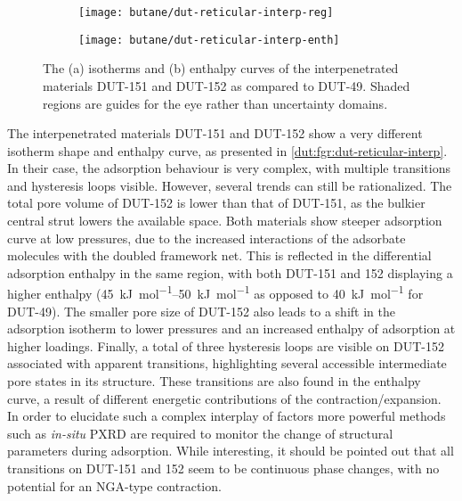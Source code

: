 \begin{figure}[htb]
    \centering
    \begin{subfigure}{0.5\linewidth}
        \texttt{[image: butane/dut-reticular-interp-reg]}%
        \caption{}\label{dut:fgr:dut-reticular-interp-reg}
    \end{subfigure}%
    \begin{subfigure}{0.5\linewidth}
        \texttt{[image: butane/dut-reticular-interp-enth]}%
        \caption{}\label{dut:fgr:dut-reticular-interp-log}
    \end{subfigure}%
    \caption{The (a) isotherms and (b) enthalpy curves of the
    interpenetrated materials DUT-151 and DUT-152 as compared to 
    DUT-49. Shaded regions are guides for the eye rather than
    uncertainty domains.}%
    \label{dut:fgr:dut-reticular-interp}
\end{figure}

The interpenetrated materials DUT-151 and DUT-152 show a very different 
isotherm shape and enthalpy curve, as presented in 
\autoref{dut:fgr:dut-reticular-interp}. In their case, the adsorption
behaviour is very complex, with multiple transitions and 
hysteresis loops visible. However, several trends can still be rationalized.
The total pore volume of DUT-152 is lower than that of DUT-151, as 
the bulkier central strut lowers the available space. Both materials 
show steeper adsorption curve at low pressures, due to the increased 
interactions of the adsorbate molecules with the doubled framework
net. This is reflected in the differential adsorption enthalpy 
in the same region, with both DUT-151 and 152 displaying a higher
enthalpy (\SIrange{45}{50}{\kilo\joule\per\mol} as opposed to 
\SI{40}{\kilo\joule\per\mol} for DUT-49). The smaller pore size 
of DUT-152 also leads to a shift in the adsorption isotherm to
lower pressures and an increased enthalpy of adsorption at higher 
loadings. Finally, a total of three hysteresis loops are visible 
on DUT-152 associated with apparent transitions, highlighting several
accessible intermediate pore states in its structure. These transitions
are also found in the enthalpy curve, a result of different energetic
contributions of the contraction/expansion. In order to elucidate 
such a complex interplay of factors more powerful methods such
as \textit{in-situ} PXRD are required to monitor the change of
structural parameters during adsorption. While interesting,
it should be pointed out that all transitions on DUT-151 and 152 
seem to be continuous phase changes, with no potential for an
NGA-type contraction.

